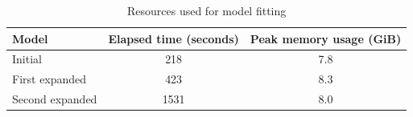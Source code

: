 \begin{table}[ht]
\centering
\caption{Resources used for model fitting} 
\label{tab:resources}
\begin{tabular}{lcc}
  \hline
Model & Elapsed time (seconds) & Peak memory usage (GiB) \\ 
  \hline
Initial & 218 & 7.8 \\ 
  First expanded & 423 & 8.3 \\ 
  Second expanded & 1531 & 8.0 \\ 
   \hline
\end{tabular}
\end{table}
